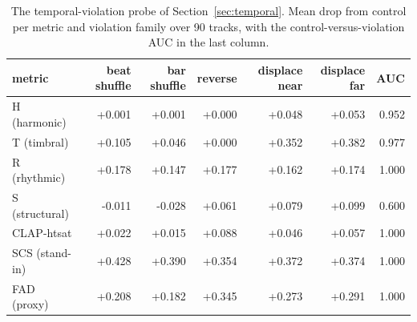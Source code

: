 \begin{table}[htbp]
\centering
\small
\caption[The temporal-violation probe]{The temporal-violation probe of Section~\ref{sec:temporal}. Mean drop from control per metric and violation family over 90 tracks, with the control-versus-violation AUC in the last column.\\}
\label{tab:temporal}
\begin{tabular}{lrrrrrr}
\toprule
metric & beat shuffle & bar shuffle & reverse & displace near & displace far & AUC \\
\midrule
H (harmonic) & +0.001 & +0.001 & +0.000 & +0.048 & +0.053 & 0.952 \\
T (timbral) & +0.105 & +0.046 & +0.000 & +0.352 & +0.382 & 0.977 \\
R (rhythmic) & +0.178 & +0.147 & +0.177 & +0.162 & +0.174 & 1.000 \\
S (structural) & -0.011 & -0.028 & +0.061 & +0.079 & +0.099 & 0.600 \\
\midrule
CLAP-htsat & +0.022 & +0.015 & +0.088 & +0.046 & +0.057 & 1.000 \\
SCS (stand-in) & +0.428 & +0.390 & +0.354 & +0.372 & +0.374 & 1.000 \\
FAD (proxy) & +0.208 & +0.182 & +0.345 & +0.273 & +0.291 & 1.000 \\
\bottomrule
\end{tabular}
\end{table}
